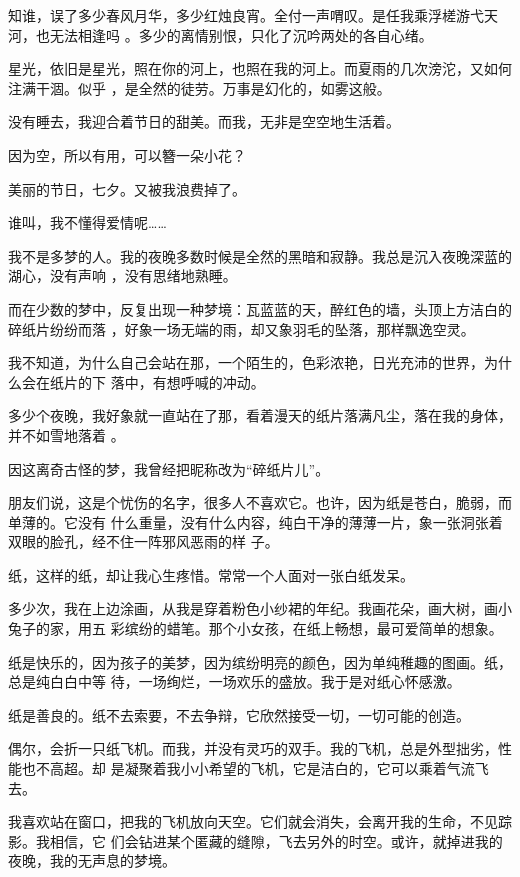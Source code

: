 \documentclass[12pt,a4paper]{article}
\begin{document}
		知谁，误了多少春风月华，多少红烛良宵。全付一声喟叹。是任我乘浮槎游弋天河，也无法相逢吗
	。多少的离情别恨，只化了沉吟两处的各自心绪。

		星光，依旧是星光，照在你的河上，也照在我的河上。而夏雨的几次滂沱，又如何注满干涸。似乎
	，是全然的徒劳。万事是幻化的，如雾这般。


		没有睡去，我迎合着节日的甜美。而我，无非是空空地生活着。

		因为空，所以有用，可以簪一朵小花？

		美丽的节日，七夕。又被我浪费掉了。

		谁叫，我不懂得爱情呢……

	\endwriting



		我不是多梦的人。我的夜晚多数时候是全然的黑暗和寂静。我总是沉入夜晚深蓝的湖心，没有声响
	，没有思绪地熟睡。


		而在少数的梦中，反复出现一种梦境：瓦蓝蓝的天，醉红色的墙，头顶上方洁白的碎纸片纷纷而落
	，好象一场无端的雨，却又象羽毛的坠落，那样飘逸空灵。

		我不知道，为什么自己会站在那，一个陌生的，色彩浓艳，日光充沛的世界，为什么会在纸片的下
	落中，有想呼喊的冲动。

		多少个夜晚，我好象就一直站在了那，看着漫天的纸片落满凡尘，落在我的身体，并不如雪地落着
	。

		因这离奇古怪的梦，我曾经把昵称改为“碎纸片儿”。

		朋友们说，这是个忧伤的名字，很多人不喜欢它。也许，因为纸是苍白，脆弱，而单薄的。它没有
	什么重量，没有什么内容，纯白干净的薄薄一片，象一张洞张着双眼的脸孔，经不住一阵邪风恶雨的样
	子。

		纸，这样的纸，却让我心生疼惜。常常一个人面对一张白纸发呆。

		多少次，我在上边涂画，从我是穿着粉色小纱裙的年纪。我画花朵，画大树，画小兔子的家，用五
	彩缤纷的蜡笔。那个小女孩，在纸上畅想，最可爱简单的想象。

		纸是快乐的，因为孩子的美梦，因为缤纷明亮的颜色，因为单纯稚趣的图画。纸，总是纯白白中等
	待，一场绚烂，一场欢乐的盛放。我于是对纸心怀感激。


		纸是善良的。纸不去索要，不去争辩，它欣然接受一切，一切可能的创造。

		偶尔，会折一只纸飞机。而我，并没有灵巧的双手。我的飞机，总是外型拙劣，性能也不高超。却
	是凝聚着我小小希望的飞机，它是洁白的，它可以乘着气流飞去。

		我喜欢站在窗口，把我的飞机放向天空。它们就会消失，会离开我的生命，不见踪影。我相信，它
	们会钻进某个匿藏的缝隙，飞去另外的时空。或许，就掉进我的夜晚，我的无声息的梦境。
\end{document}
